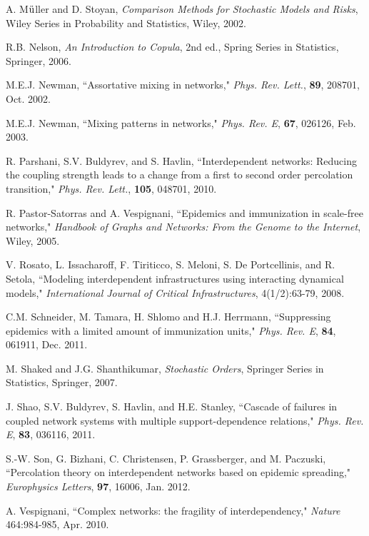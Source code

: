 \documentclass[10pt, journal, compsoc]{IEEEtran}
\begin{document}
\begin{thebibliography}{1}
A. M${\ddot{\rm u}}$ller and D. Stoyan, 
{\em Comparison Methods for Stochastic Models and Risks},
Wiley Series in Probability and Statistics, Wiley, 2002. 

R.B. Nelson,
{\em An Introduction to Copula}, 2nd ed., 
Spring Series in Statistics, Springer, 2006. 

M.E.J. Newman, 
``Assortative mixing in networks," 
{\em Phys. Rev. Lett.}, {\bf 89}, 208701, Oct. 2002.

M.E.J. Newman, 
``Mixing patterns in networks," 
{\em Phys. Rev. E}, {\bf 67}, 026126, Feb. 2003.

R. Parshani, S.V. Buldyrev, and S. Havlin, 
``Interdependent networks: Reducing the coupling 
	strength leads to a change from a first to 
	second order percolation transition,"
{\em Phys. Rev. Lett.}, {\bf 105}, 048701, 2010.

R. Pastor-Satorras and A. Vespignani,
``Epidemics and immunization in scale-free networks,"
{\em Handbook of Graphs and Networks: From the Genome to the 
	Internet}, Wiley, 2005. 
	
V. Rosato, L. Issacharoff, F. Tiriticco, S. Meloni, 
	S. De Portcellinis, and R. Setola, 
``Modeling interdependent infrastructures using
	interacting dynamical models,"
{\em International Journal of Critical Infrastructures}, 
4(1/2):63-79, 2008. 

C.M. Schneider, M. Tamara, H. Shlomo and H.J. Herrmann, 
``Suppressing epidemics with a limited amount of immunization
	units,"
{\em Phys. Rev. E}, {\bf 84}, 061911, Dec. 2011. 

M. Shaked and J.G. Shanthikumar,
{\em Stochastic Orders}, 
Springer Series in Statistics, Springer, 2007. 

J. Shao, S.V. Buldyrev, S. Havlin, and H.E. Stanley, 
``Cascade of failures in coupled network systems with
	multiple support-dependence relations,"
{\em Phys. Rev. E}, {\bf 83}, 036116, 2011. 

S.-W. Son, G. Bizhani, C. Christensen, P. Grassberger, 
	and M. Paczuski, 
``Percolation theory on interdependent networks based
	on epidemic spreading,"
{\em Europhysics Letters}, {\bf 97}, 16006, Jan. 2012.


A. Vespignani, 
``Complex networks: the fragility of interdependency,"
{\em Nature} 464:984-985, Apr. 2010. 


\end{thebibliography}
\end{document}
